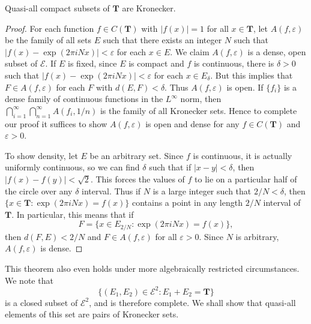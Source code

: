 \begin{theorem}
	Quasi-all compact subsets of $\mathbf{T}$ are Kronecker.
\end{theorem}
\begin{proof}
	For each function $f \in C(\mathbf{T})$ with $|f(x)| = 1$ for all $x \in \mathbf{T}$, let $A(f,\varepsilon)$ be the family of all sets $E$ such that there exists an integer $N$ such that $|f(x) - \exp(2 \pi i N x)| < \varepsilon$ for each $x \in E$. We claim $A(f,\varepsilon)$ is a dense, open subset of $\mathcal{E}$. If $E$ is fixed, since $E$ is compact and $f$ is continuous, there is $\delta > 0$ such that $|f(x) - \exp(2 \pi i N x)| < \varepsilon$ for each $x \in E_\delta$. But this implies that $F \in A(f,\varepsilon)$ for each $F$ with $d(E,F) < \delta$. Thus $A(f,\varepsilon)$ is open. If $\{ f_i \}$ is a dense family of continuous functions in the $L^\infty$ norm, then $\bigcap_{i = 1}^\infty \bigcap_{n = 1}^\infty A(f_i,1/n)$ is the family of all Kronecker sets. Hence to complete our proof it suffices to show $A(f,\varepsilon)$ is open and dense for any $f \in C(\mathbf{T})$ and $\varepsilon > 0$.

	To show density, let $E$ be an arbitrary set. Since $f$ is continuous, it is actually uniformly continuous, so we can find $\delta$ such that if $|x - y| < \delta$, then $|f(x) - f(y)| < \sqrt{2}$. This forces the values of $f$ to lie on a particular half of the circle over any $\delta$ interval. Thus if $N$ is a large integer such that $2/N < \delta$, then $\{ x \in \mathbf{T}: \exp(2 \pi i N x) = f(x) \}$ contains a point in any length $2/N$ interval of $\mathbf{T}$. In particular, this means that if
	\[ F = \{ x \in E_{2/N} : \exp(2 \pi i N x) = f(x) \}, \]
	then $d(F,E) < 2/N$ and $F \in A(f,\varepsilon)$ for all $\varepsilon > 0$. Since $N$ is arbitrary, $A(f,\varepsilon)$ is dense.
\end{proof}

This theorem also even holds under more algebraically restricted circumstances. We note that
%
\[ \{ (E_1,E_2) \in \mathcal{E}^2: E_1 + E_2 = \mathbf{T} \} \]
%
is a closed subset of $\mathcal{E}^2$, and is therefore complete. We shall show that quasi-all elements of this set are pairs of Kronecker sets.

